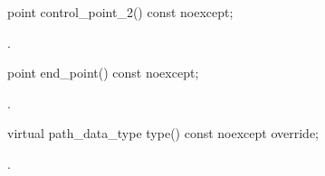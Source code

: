 \begin{itemdecl}
    point control_point_2() const noexcept;
\end{itemdecl}
\begin{itemdescr}
	\pnum
	\returns
	.

\end{itemdescr}

\begin{itemdecl}
    point end_point() const noexcept;
\end{itemdecl}
\begin{itemdescr}
	\pnum
	\returns
	.

\end{itemdescr}

\begin{itemdecl}
    virtual path_data_type type() const noexcept override;
\end{itemdecl}
\begin{itemdescr}
	\pnum
	\returns
	.

\end{itemdescr}
